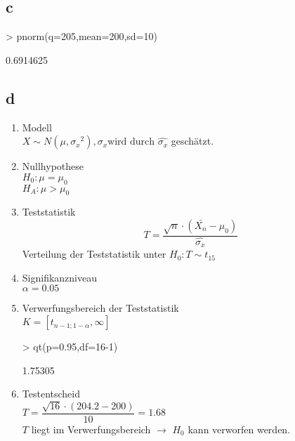 \subsection{c}
\begin{Schunk}
\begin{Sinput}
> pnorm(q=205,mean=200,sd=10)
\end{Sinput}
\begin{Soutput}
[1] 0.6914625
\end{Soutput}
\end{Schunk}

\subsection{d}
\begin{enumerate}
  \item Modell \\
        $ X \sim N(\mu, {\sigma_x}^2), \sigma_x 
        \text{wird durch $\hat{\sigma_x}$}$ geschätzt. 
  \item Nullhypothese \\
        $ H_0: \mu = \mu_0 $ \\
        $ H_A: \mu > \mu_0 $
  \item Teststatistik \\
        \[ T = \frac{\sqrt{n}\cdot (\bar{X_n} - \mu_0)}{\hat{\sigma_x}} \] 
        Verteilung der Teststatistik unter $ H_0: T \sim t_{15} $
  \item Signifikanzniveau \\
        $ \alpha = 0.05 $
  \item Verwerfungsbereich der Teststatistik \\
        $ K = [t_{n-1;1-\alpha}, \infty] $
\begin{Schunk}
\begin{Sinput}
>         qt(p=0.95,df=16-1)
\end{Sinput}
\begin{Soutput}
[1] 1.75305
\end{Soutput}
\end{Schunk}
  \item Testentscheid \\
        $ T = \dfrac{\sqrt{16} \cdot (204.2 - 200)}{10} = 1.68 $ \\
        $T$ liegt im Verwerfungsbereich $\rightarrow$ $H_0$ kann verworfen 
        werden. 
\end{enumerate}
